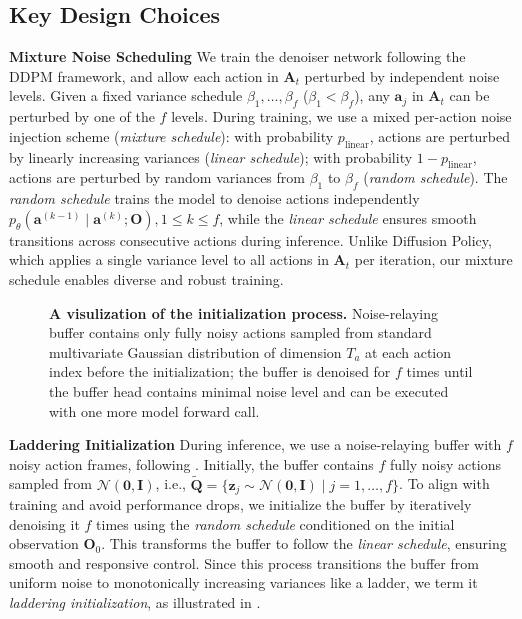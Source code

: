 \subsection{Key Design Choices}
\label{sec:key_design_choices}

\textbf{Mixture Noise Scheduling}
We train the denoiser network following the DDPM \citep{ho2020denoising} framework, and allow each action in \(\mathbf{A}_t\) perturbed by independent noise levels. Given a fixed variance schedule \(\beta_1, \ldots, \beta_f\) (\(\beta_1 < \beta_f\)), any \(\mathbf{a}_j\) in \(\mathbf{A}_t\) can be perturbed by one of the \(f\) levels. During training, we use a mixed per-action noise injection scheme (\emph{mixture schedule}): with probability \(p_{\mathrm{linear}}\), actions are perturbed by linearly increasing variances (\emph{linear schedule}); with probability \(1-p_{\mathrm{linear}}\), actions are perturbed by random variances from \(\beta_1\) to \(\beta_f\) (\emph{random schedule}). The \emph{random schedule} trains the model to denoise actions independently \(p_\theta(\mathbf{a}^{(k-1)} \mid \mathbf{a}^{(k)}; \mathbf{O}), 1 \leq k \leq f\), while the \emph{linear schedule} ensures smooth transitions across consecutive actions during inference. Unlike Diffusion Policy, which applies a single variance level to all actions in \(\mathbf{A}_t\) per iteration, our mixture schedule enables diverse and robust training.

\begin{figure}[!ht]
    \centering
    \caption{
    \textbf{A visulization of the initialization process.} Noise-relaying buffer contains only fully noisy actions sampled from standard multivariate Gaussian distribution of dimension $T_a$ at each action index before the initialization; the buffer is denoised for $f$ times until the buffer head contains minimal noise level and can be executed with one more model forward call.
    }
    \label{fig:laddering_initialization}
\end{figure}

\textbf{Laddering Initialization}
During inference, we use a noise-relaying buffer with \(f\) noisy action frames, following . Initially, the buffer contains \(f\) fully noisy actions sampled from \(\mathcal{N}(\mathbf{0}, \mathbf{I})\), i.e., \(\tilde{\mathbf{Q}} = \{\mathbf{z}_j \sim \mathcal{N}(\mathbf{0}, \mathbf{I}) \mid j = 1, \ldots, f\}\). To align with training and avoid performance drops, we initialize the buffer by iteratively denoising it \(f\) times using the \emph{random schedule} conditioned on the initial observation \(\mathbf{O}_0\). This transforms the buffer to follow the \emph{linear schedule}, ensuring smooth and responsive control. Since this process transitions the buffer from uniform noise to monotonically increasing variances like a ladder, we term it \emph{laddering initialization}, as illustrated in .

